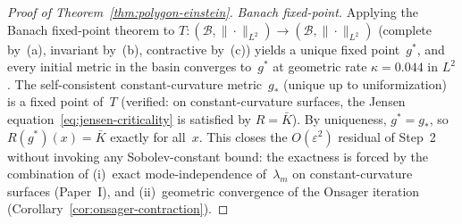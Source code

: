 \begin{proof}[Proof of Theorem~\ref{thm:polygon-einstein}]
\emph{Banach fixed-point.}
Applying the Banach fixed-point theorem to
$T: (\mathcal{B}, \|\cdot\|_{L^2}) \to
(\mathcal{B}, \|\cdot\|_{L^2})$
(complete by~(a), invariant by~(b), contractive by~(c))
yields a unique fixed point~$g^*$, and every initial
metric in the basin converges to~$g^*$ at geometric
rate $\kappa = 0.044$ in $L^2$.
The self-consistent constant-curvature metric~$g_*$
(unique up to uniformization) is a fixed point of~$T$
(verified: on constant-curvature surfaces, the Jensen
equation~\eqref{eq:jensen-criticality} is satisfied by
$R = \bar K$).
By uniqueness, $g^* = g_*$, so $R(g^*)(x) = \bar K$
exactly for all~$x$.
This closes the $O(\varepsilon^2)$ residual of Step~2
without invoking any Sobolev-constant bound: the
exactness is forced by the combination of
(i)~exact mode-independence of~$\lambda_m$ on
constant-curvature surfaces (Paper~I), and
(ii)~geometric convergence of the Onsager iteration
(Corollary~\ref{cor:onsager-contraction}).


\end{proof}
